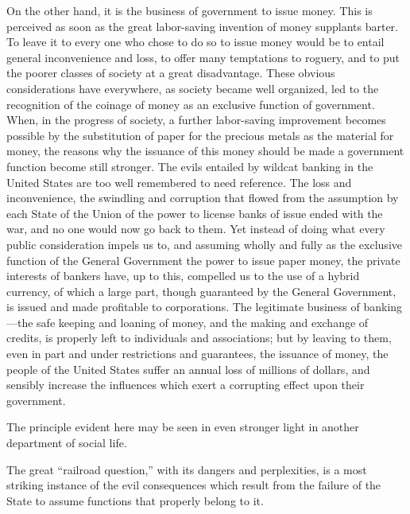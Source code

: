 \documentclass{book}
\begin{document}
On the other hand, it is the business of government to issue money. This is perceived as soon as the great labor-saving invention of money supplants barter. To leave it to every one who chose to do so to issue money would be to entail general inconvenience and loss, to offer many temptations to roguery, and to put the poorer classes of society at a great disadvantage. These obvious considerations have everywhere, as society became well organized, led to the recognition of the coinage of money as an exclusive function of government. When, in the progress of society, a further labor-saving improvement becomes possible by the substitution of paper for the precious metals as the material for money, the reasons why the issuance of this money should be made a government function become still stronger. The evils entailed by wildcat banking in the United States are too well remembered to need reference. The loss and inconvenience, the swindling and corruption that flowed from the assumption by each State of the Union of the power to license banks of issue ended with the war, and no one would now go back to them. Yet instead of doing what every public consideration impels us to, and assuming wholly and fully as the exclusive function of the General Government the power to issue paper money, the private interests of bankers have, up to this, compelled us to the use of a hybrid currency, of which a large part, though guaranteed by the General Government, is issued and made profitable to corporations. The legitimate business of banking—the safe keeping and loaning of money, and the making and exchange of credits, is properly left to individuals and associations; but by leaving to them, even in part and under restrictions and guarantees, the issuance of money, the people of the United States suffer an annual loss of millions of dollars, and sensibly increase the influences which exert a corrupting effect upon their government.

The principle evident here may be seen in even stronger light in another department of social life.

The great “railroad question,” with its dangers and perplexities, is a most striking instance of the evil consequences which result from the failure of the State to assume functions that properly belong to it.
\end{document}
